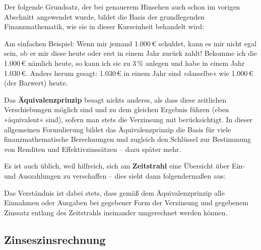 Der folgende Grundsatz, der bei genauerem Hinsehen auch schon im vorigen Abschnitt angewendet wurde, bildet die Basis der grundlegenden Finanzmathematik, wie sie in dieser Kurseinheit behandelt wird:

Am einfachen Beispiel: Wenn mir jemand 1.000\,€ schuldet, kann es mir nicht egal sein, ob er mir diese heute oder erst in einem Jahr zurück zahlt! Bekomme ich die 1.000\,€ nämlich heute, so kann ich sie zu 3\,\% anlegen und habe in einem Jahr 1.030\,€. Anders herum gesagt: 1.030\,€ in einem Jahr sind »dasselbe« wie 1.000\,€ (der Barwert) heute.

Das \textbf{Äquivalenzprinzip} besagt nichts anderes, als dass diese zeitlichen Verschiebungen möglich sind und zu dem gleichen Ergebnis führen (eben »äquivalent« sind), sofern man stets die Verzinsung mit berücksichtigt. In dieser allgemeinen Formulierung bildet das Äquivalenzprinzip die Basis für viele finanzmathematische Berechnungen und zugleich den Schlüssel zur Bestimmung von Renditen und Effektivzinssätzen -- dazu später mehr.

Es ist auch üblich, weil hilfreich, sich am \textbf{Zeitstrahl} eine Übersicht über Ein- und Auszahlungen zu verschaffen -- dies sieht dann folgendermaßen aus:

\begin{center}
\end{center}

Das Verständnis ist dabei stets, dass gemäß dem Äquivalenzprinzip alle Einnahmen oder Ausgaben bei gegebener Form der Verzinsung und gegebenem Zinssatz entlang des Zeitstrahls ineinander umgerechnet werden können.

\subsection{Zinseszinsrechnung}

